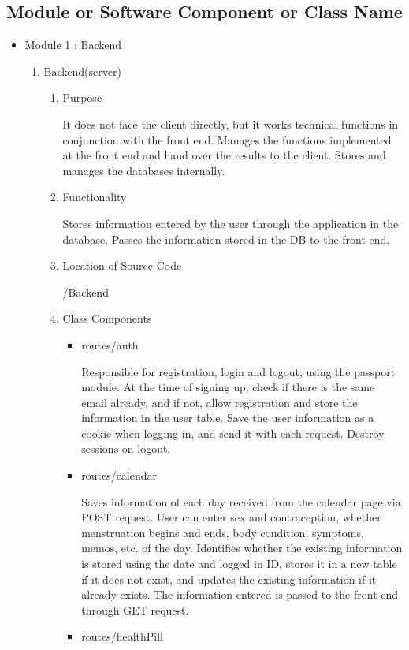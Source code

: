 \documentclass[conference]{IEEEtran}
\begin{document}
\subsection{Module or Software Component or Class Name}
\begin{itemize}
    \item Module 1 : Backend
    \begin{enumerate}
        \item Backend(server)
        \begin{enumerate}
            \item Purpose
            
           \setlength{\parindent}{2ex} It does not face the client directly, but it works technical functions in conjunction with the front end. Manages the functions implemented at the front end and hand over the results to the client. Stores and manages the databases internally.
            \item Functionality
            
            \setlength{\parindent}{2ex} Stores information entered by the user through the application in the database. Passes the information stored in the DB to the front end.
            \item Location of Source Code
            
            /Backend
            \item Class Components
            
            \begin{itemize}
                \item routes/auth
            
                \setlength{\parindent}{2ex} Responsible for registration, login and logout, using the passport module. At the time of signing up, check if there is the same email already, and if not, allow registration and store the information in the user table. Save the user information as a cookie when logging in, and send it with each request. Destroy sessions on logout.
                \item routes/calendar
            
               \setlength{\parindent}{2ex} Saves information of each day received from the calendar page via POST request. User can enter sex and contraception, whether menstruation begins and ends, body condition, symptoms, memos, etc. of the day. Identifies whether the existing information is stored using the date and logged in ID, stores it in a new table if it does not exist, and updates the existing information if it already exists. The information entered is passed to the front end through GET request.
                \item routes/healthPill
            

\end{itemize}
\end{enumerate}
\end{enumerate}
\end{itemize}
\end{document}
